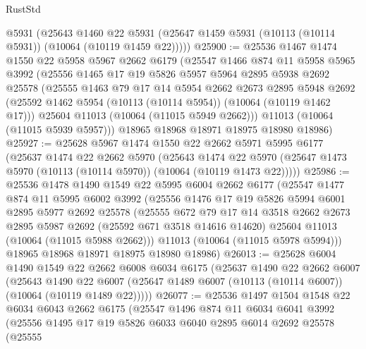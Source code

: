 \begin{lexlean}{RustStd}
\begin{coremodule}
      @5931
      (@25643
        @1460
        @22
        @5931
        (@25647 @1459 @5931 (@10113 (@10114 @5931)) (@10064 (@10119 @1459 @22)))))
@25900 := @25536
    @1467
    @1474
    @1550
    @22
    @5958
    @5967
    @2662
    @6179
    (@25547
      @1466
      @874
      @11
      @5958
      @5965
      @3992
      (@25556
        @1465
        @17
        @19
        @5826
        @5957
        @5964
        @2895
        @5938
        @2692
        @25578
        (@25555
          @1463
          @79
          @17
          @14
          @5954
          @2662
          @2673
          @2895
          @5948
          @2692
          (@25592 @1462 @5954 (@10113 (@10114 @5954)) (@10064 (@10119 @1462 @17)))
          @25604
          @11013
          (@10064 (@11015 @5949 @2662)))
        @11013
        (@10064 (@11015 @5939 @5957)))
      @18965
      @18968
      @18971
      @18975
      @18980
      @18986)
@25927 := @25628
    @5967
    @1474
    @1550
    @22
    @2662
    @5971
    @5995
    @6177
    (@25637
      @1474
      @22
      @2662
      @5970
      (@25643
        @1474
        @22
        @5970
        (@25647 @1473 @5970 (@10113 (@10114 @5970)) (@10064 (@10119 @1473 @22)))))
@25986 := @25536
    @1478
    @1490
    @1549
    @22
    @5995
    @6004
    @2662
    @6177
    (@25547
      @1477
      @874
      @11
      @5995
      @6002
      @3992
      (@25556
        @1476
        @17
        @19
        @5826
        @5994
        @6001
        @2895
        @5977
        @2692
        @25578
        (@25555
          @672
          @79
          @17
          @14
          @3518
          @2662
          @2673
          @2895
          @5987
          @2692
          (@25592 @671 @3518 @14616 @14620)
          @25604
          @11013
          (@10064 (@11015 @5988 @2662)))
        @11013
        (@10064 (@11015 @5978 @5994)))
      @18965
      @18968
      @18971
      @18975
      @18980
      @18986)
@26013 := @25628
    @6004
    @1490
    @1549
    @22
    @2662
    @6008
    @6034
    @6175
    (@25637
      @1490
      @22
      @2662
      @6007
      (@25643
        @1490
        @22
        @6007
        (@25647 @1489 @6007 (@10113 (@10114 @6007)) (@10064 (@10119 @1489 @22)))))
@26077 := @25536
    @1497
    @1504
    @1548
    @22
    @6034
    @6043
    @2662
    @6175
    (@25547
      @1496
      @874
      @11
      @6034
      @6041
      @3992
      (@25556
        @1495
        @17
        @19
        @5826
        @6033
        @6040
        @2895
        @6014
        @2692
        @25578
        (@25555

\end{coremodule}
\end{lexlean}
